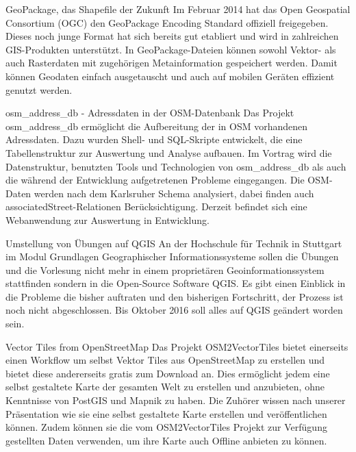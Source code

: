 \renewcommand{\konferenztag}{\dienstag}
%
{GeoPackage, das Shapefile der Zukunft}%
{}%
{Im Februar 2014 hat das Open Geospatial Consortium (OGC) den GeoPackage Encoding Standard offiziell
freigegeben. Dieses noch junge Format hat sich bereits gut etabliert und wird in zahlreichen GIS-Produkten unterstützt.
In GeoPackage-Dateien können sowohl Vektor- als auch Rasterdaten mit zugehörigen Metainformation gespeichert
werden. Damit können Geodaten einfach ausgetauscht und auch auf mobilen Geräten effizient genutzt werden.}

%
{osm\_address\_db - Adressdaten in der OSM-Datenbank}%
{}%
{Das Projekt osm\_address\_db ermöglicht die Aufbereitung der in OSM vorhandenen Adressdaten. Dazu wurden Shell-
und SQL-Skripte entwickelt, die eine Tabellenstruktur zur Auswertung und Analyse aufbauen.
Im Vortrag wird die Datenstruktur, benutzten Tools und Technologien von osm\_address\_db als auch die während der
Entwicklung aufgetretenen Probleme eingegangen. Die OSM-Daten werden nach dem Karlsruher Schema analysiert,
dabei finden auch associatedStreet-Relationen Berücksichtigung.
Derzeit befindet sich eine Webanwendung zur Auswertung in Entwicklung.}

%
{Umstellung von Übungen auf QGIS}%
{}%
{An der Hochschule für Technik in Stuttgart im Modul Grundlagen Geographischer Informationssysteme
sollen die Übungen und die Vorlesung nicht mehr in einem proprietären Geoinformationssystem
stattfinden sondern in die Open-Source Software QGIS. Es gibt einen Einblick in die Probleme
die bisher auftraten und den bisherigen Fortschritt, der Prozess ist noch nicht abgeschlossen.
Bis Oktober 2016 soll alles auf QGIS geändert worden sein.}

%
{Vector Tiles from OpenStreetMap}%
{}%
{Das Projekt OSM2VectorTiles bietet einerseits einen Workflow um selbst Vektor Tiles aus OpenStreetMap zu erstellen und bietet diese andererseits gratis zum Download an. Dies ermöglicht jedem eine selbst gestaltete Karte der gesamten Welt zu erstellen und anzubieten, ohne Kenntnisse von PostGIS und Mapnik zu haben.
Die Zuhörer wissen nach unserer Präsentation wie sie eine selbst gestaltete Karte erstellen und veröffentlichen können. Zudem können sie die vom OSM2VectorTiles Projekt zur Verfügung gestellten Daten verwenden, um ihre Karte auch Offline anbieten zu können.}


